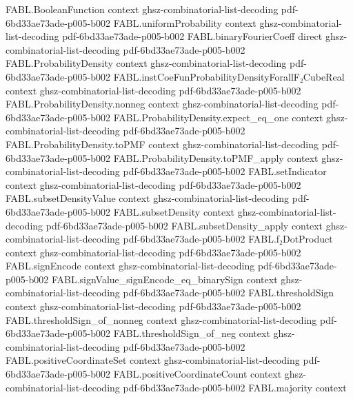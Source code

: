 \begin{theorem}
\proofstep
  {FABL.BooleanFunction}
  {context}
  {ghsz-combinatorial-list-decoding}
  {pdf-6bd33ae73ade-p005-b002}
\proofstep
  {FABL.uniformProbability}
  {context}
  {ghsz-combinatorial-list-decoding}
  {pdf-6bd33ae73ade-p005-b002}
\proofstep
  {FABL.binaryFourierCoeff}
  {direct}
  {ghsz-combinatorial-list-decoding}
  {pdf-6bd33ae73ade-p005-b002}
\proofstep
  {FABL.ProbabilityDensity}
  {context}
  {ghsz-combinatorial-list-decoding}
  {pdf-6bd33ae73ade-p005-b002}
\proofstep
  {FABL.instCoeFunProbabilityDensityForallF₂CubeReal}
  {context}
  {ghsz-combinatorial-list-decoding}
  {pdf-6bd33ae73ade-p005-b002}
\proofstep
  {FABL.ProbabilityDensity.nonneg}
  {context}
  {ghsz-combinatorial-list-decoding}
  {pdf-6bd33ae73ade-p005-b002}
\proofstep
  {FABL.ProbabilityDensity.expect_eq_one}
  {context}
  {ghsz-combinatorial-list-decoding}
  {pdf-6bd33ae73ade-p005-b002}
\proofstep
  {FABL.ProbabilityDensity.toPMF}
  {context}
  {ghsz-combinatorial-list-decoding}
  {pdf-6bd33ae73ade-p005-b002}
\proofstep
  {FABL.ProbabilityDensity.toPMF_apply}
  {context}
  {ghsz-combinatorial-list-decoding}
  {pdf-6bd33ae73ade-p005-b002}
\proofstep
  {FABL.setIndicator}
  {context}
  {ghsz-combinatorial-list-decoding}
  {pdf-6bd33ae73ade-p005-b002}
\proofstep
  {FABL.subsetDensityValue}
  {context}
  {ghsz-combinatorial-list-decoding}
  {pdf-6bd33ae73ade-p005-b002}
\proofstep
  {FABL.subsetDensity}
  {context}
  {ghsz-combinatorial-list-decoding}
  {pdf-6bd33ae73ade-p005-b002}
\proofstep
  {FABL.subsetDensity_apply}
  {context}
  {ghsz-combinatorial-list-decoding}
  {pdf-6bd33ae73ade-p005-b002}
\proofstep
  {FABL.f₂DotProduct}
  {context}
  {ghsz-combinatorial-list-decoding}
  {pdf-6bd33ae73ade-p005-b002}
\proofstep
  {FABL.signEncode}
  {context}
  {ghsz-combinatorial-list-decoding}
  {pdf-6bd33ae73ade-p005-b002}
\proofstep
  {FABL.signValue_signEncode_eq_binarySign}
  {context}
  {ghsz-combinatorial-list-decoding}
  {pdf-6bd33ae73ade-p005-b002}
\proofstep
  {FABL.thresholdSign}
  {context}
  {ghsz-combinatorial-list-decoding}
  {pdf-6bd33ae73ade-p005-b002}
\proofstep
  {FABL.thresholdSign_of_nonneg}
  {context}
  {ghsz-combinatorial-list-decoding}
  {pdf-6bd33ae73ade-p005-b002}
\proofstep
  {FABL.thresholdSign_of_neg}
  {context}
  {ghsz-combinatorial-list-decoding}
  {pdf-6bd33ae73ade-p005-b002}
\proofstep
  {FABL.positiveCoordinateSet}
  {context}
  {ghsz-combinatorial-list-decoding}
  {pdf-6bd33ae73ade-p005-b002}
\proofstep
  {FABL.positiveCoordinateCount}
  {context}
  {ghsz-combinatorial-list-decoding}
  {pdf-6bd33ae73ade-p005-b002}
\proofstep
  {FABL.majority}
  {context}

\end{theorem}
